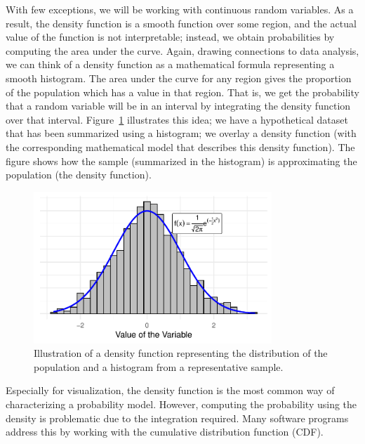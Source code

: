 \documentclass[
  letterpaper,
  DIV=11,
  numbers=noendperiod]{scrreprt}
\theoremstyle{definition}
\theoremstyle{definition}
\theoremstyle{remark}
\begin{document}
With few exceptions, we will be working with continuous random
variables. As a result, the density function is a smooth function over
some region, and the actual value of the function is not interpretable;
instead, we obtain probabilities by computing the area under the curve.
Again, drawing connections to data analysis, we can think of a density
function as a mathematical formula representing a smooth histogram. The
area under the curve for any region gives the proportion of the
population which has a value in that region. That is, we get the
probability that a random variable will be in an interval by integrating
the density function over that interval.
Figure~\ref{fig-essential-probability-density} illustrates this idea; we
have a hypothetical dataset that has been summarized using a histogram;
we overlay a density function (with the corresponding mathematical model
that describes this density function). The figure shows how the sample
(summarized in the histogram) is approximating the population (the
density function).

\begin{figure}

{\centering \includegraphics[width=0.8\textwidth,height=\textheight]{./images/fig-essential-probability-density-1.pdf}

}

\caption{\label{fig-essential-probability-density}Illustration of a
density function representing the distribution of the population and a
histogram from a representative sample.}

\end{figure}

Especially for visualization, the density function is the most common
way of characterizing a probability model. However, computing the
probability using the density is problematic due to the integration
required. Many software programs address this by working with the
cumulative distribution function (CDF).
\end{document}
